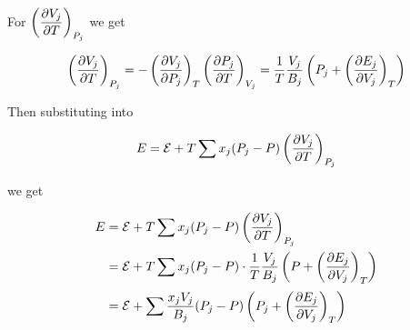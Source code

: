 \documentclass[10pt]{scrartcl}
\begin{document}
	For $\displaystyle\left( \frac{\partial V_j}{\partial T} \right)_{P_j}$ we get
	
	\begin{equation}
		\displaystyle\left( \frac{\partial V_j}{\partial T} \right)_{P_j} = -\displaystyle\left( \frac{\partial V_j}{\partial P_j} \right)_T\displaystyle\left( \frac{\partial P_j}{\partial T} \right)_{V_j} = \frac{1}{T}\frac{V_j}{B_j}\displaystyle\left( P_j + \displaystyle\left( \frac{\partial E_j}{\partial V_j} \right)_T \right)
	\end{equation}

	Then substituting into
	
	\begin{equation}
		E = \mc{E} + T\sum x_j(P_j - P)\cpd{V_j}{T}_{P_j}
	\end{equation}

	we get
		
	\begin{align*}
		E
		& = \mc{E} + T\sum x_j(P_j - P)\cpd{V_j}{T}_{P_j} \\
		& = \mc{E} + T\sum x_j(P_j - P) \cdot \frac{1}{T}\frac{V_j}{B_j}\paren{P + \cpd{E_j}{V_j}_T} \\
		& = \mc{E} + \sum \frac{x_jV_j}{B_j}(P_j - P)\paren{P_j + \cpd{E_j}{V_j}_T} \\
	\end{align*}


\end{document}
